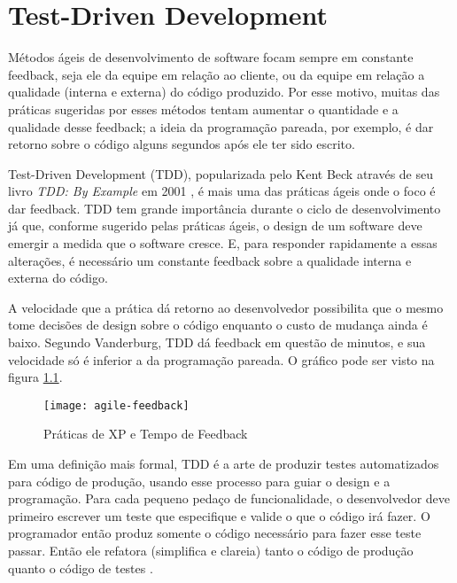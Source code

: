 
\chapter{Test-Driven Development}
\label{cap:tdd}

Métodos ágeis de desenvolvimento de software focam sempre em constante
feedback, seja ele da equipe em relação ao cliente, ou da equipe em relação a
qualidade (interna e externa) do código produzido. Por esse motivo, muitas das
práticas sugeridas por esses métodos tentam aumentar o quantidade e a qualidade
desse feedback; a ideia da programação pareada, por exemplo, é dar retorno
sobre o código alguns segundos após ele ter sido escrito.

Test-Driven Development (TDD), popularizada pelo Kent Beck através de seu livro
\textit{TDD: By Example} em 2001 \cite{TDDByExample}, é mais uma das práticas
ágeis onde o foco é dar feedback. TDD tem grande importância durante o ciclo de
desenvolvimento já que, conforme sugerido pelas práticas ágeis, o design de um
software deve emergir a medida que o software cresce. E, para responder
rapidamente a essas alterações, é necessário um constante feedback sobre a
qualidade interna e externa do código.

A velocidade que a prática dá retorno ao desenvolvedor possibilita que o mesmo
tome decisões de design sobre o código enquanto o custo de mudança ainda é
baixo. Segundo Vanderburg, TDD dá feedback em questão de minutos, e sua
velocidade só é inferior a da programação pareada. O gráfico pode ser visto na
figura \ref{fig:agile-feedback}.

\begin{figure}
  \centering
  \texttt{[image: agile-feedback]}
  \caption{Práticas de XP e Tempo de Feedback}
  \label{fig:agile-feedback}
\end{figure}

Em uma definição mais formal, TDD é a arte de produzir testes automatizados para
código de produção, usando esse processo para guiar o design e a programação.
Para cada pequeno pedaço de funcionalidade, o desenvolvedor deve primeiro
escrever um teste que especifique e valide o que o código irá fazer. O
programador então produz somente o código necessário para fazer esse teste
passar. Então ele refatora (simplifica e clareia) tanto o código de produção
quanto o código de testes \cite{agilealliance-tdd} \cite{tdd-taxonomy}.


